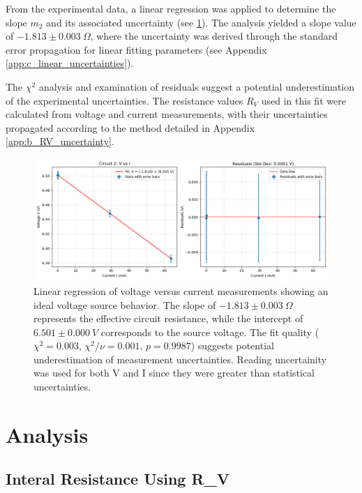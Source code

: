 \documentclass{article} %
\begin{document}
From the experimental data, a linear regression was applied to determine the slope $m_2$ and its associated uncertainty (see \ref{fig:circuit_2_fit}). 
The analysis yielded a slope value of $-1.813 \pm 0.003~\Omega$, where the uncertainty was derived through the standard error propagation for linear fitting parameters (see Appendix \ref{app:c_linear_uncertainties}).


The $\chi^2$ analysis and examination of residuals suggest a potential underestimation of the experimental uncertainties. 
The resistance values $R_V$ used in this fit were calculated from voltage and current measurements, with their uncertainties propagated according to the method detailed in Appendix \ref{app:b_RV_uncertainty}.

\begin{figure}[htbp]
  \centering
  \includegraphics[width=1\linewidth]{Figs/Circuit_2.png}
    \caption{Linear regression of voltage versus current measurements showing an ideal voltage source behavior. 
                The slope of $-1.813 \pm 0.003~\Omega$ represents the effective circuit resistance, while the intercept of $6.501 \pm 0.000~V$ corresponds to the source voltage. 
                The fit quality ($\chi^2 = 0.003$, $\chi^2/\nu = 0.001$, $p = 0.9987$) suggests potential underestimation of measurement uncertainties.
                Reading uncertainity was used for both V and I since they were greater than statistical uncertainties.}
    \label{fig:circuit_2_fit}
\end{figure}

\section{Analysis}

\subsection{Interal Resistance Using R\_V}
\end{document}
